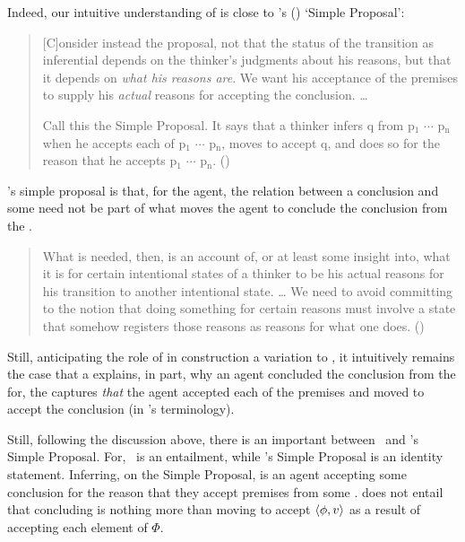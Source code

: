 \begin{note}
  Indeed, our intuitive understanding of \ros{} is close to \citeauthor{Wright:2014tt}'s (\citeyear{Wright:2014tt}) `Simple Proposal':
  \begin{quote}
    [C]onsider instead the proposal, not that the status of the transition as inferential depends on the thinker's judgments about his reasons, but that it depends on \emph{what his reasons are}.
    We want his acceptance of the premises to supply his \emph{actual} reasons for accepting the conclusion.
    \dots

    Call this the Simple Proposal.
    It says that a thinker infers q from p\(_{1}\) \(\cdots\) p\(_{\text{n}}\) when he accepts each of p\(_{1}\) \(\cdots\) p\(_{\text{n}}\), moves to accept q, and does so for the reason that he accepts p\(_{1}\) \(\cdots\) p\(_{\text{n}}\).%
    \mbox{}\hfill\mbox{(\citeyear[33]{Wright:2014tt})}
  \end{quote}

  \citeauthor{Wright:2014tt}'s simple proposal is that, for the agent, the relation between a conclusion and some \pool{} need not be part of what moves the agent to conclude the conclusion from the \pool{}.

  \begin{quote}
    What is needed, then, is an account of, or at least some insight into, what it is for certain intentional states of a thinker to be his actual reasons for his transition to another intentional state.
    \dots
    We need to avoid committing to the notion that doing something for certain reasons must involve a state that somehow registers those reasons as reasons for what one does.%
    \mbox{}\hfill\mbox{(\citeyear[34]{Wright:2014tt})}
  \end{quote}

  Still, anticipating the role of \ros{} in construction a variation to \qWhy{}, it intuitively remains the case that a \ros{} explains, in part, why an agent concluded the conclusion from the \pool{} for, the \ros{} captures \emph{that} the agent accepted each of the premises and moved to accept the conclusion (in \citeauthor{Wright:2014tt}'s terminology).

  Still, following the discussion above, there is an important between~\supportI{} and \citeauthor{Wright:2014tt}'s Simple Proposal.
  For,~\supportI{} is an entailment, while \citeauthor{Wright:2014tt}'s Simple Proposal is an identity statement.
  Inferring, on the Simple Proposal, is an agent accepting some conclusion for the reason that they accept premises from some \pool{}.
  \supportI{} does not entail that concluding is nothing more than moving to accept \(\langle \phi, v \rangle\) as a result of accepting each element of \(\Phi\).
\end{note}


